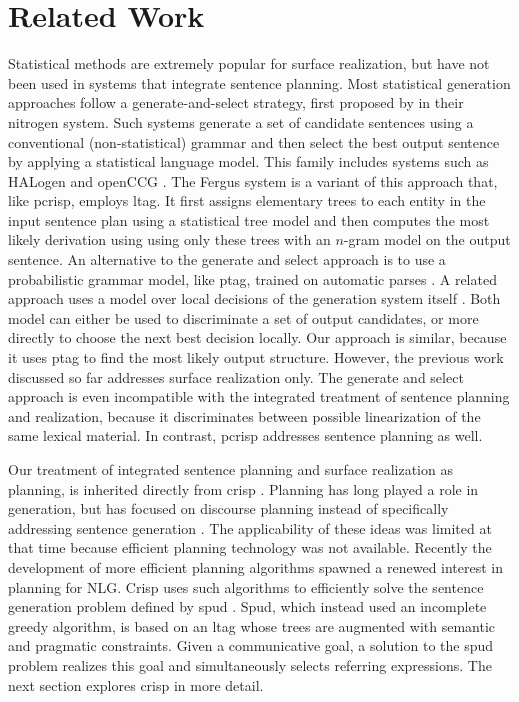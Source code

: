 \section{Related Work}
\label{sec:related}
Statistical methods are extremely popular for surface realization, but have not been used in systems that integrate sentence planning. Most statistical generation approaches follow a generate-and-select strategy, first proposed by  in their {\sc nitrogen} system. Such systems generate a set of candidate sentences using a conventional (non-statistical) grammar and then select the best output sentence by applying a statistical language model. This family includes systems such as {\sc HAL}ogen \cite{langkildeknight1998,langkilde2000} and open{\sc CCG} \cite{whitebaldridge2003}.  The {\sc Fergus} system \cite{bangalorerambow2000} is a variant of this approach that, like {\sc pcrisp}, employs {\sc ltag}. It first assigns elementary trees to each entity in the input sentence plan using a statistical tree model and then computes the most likely derivation using using only these trees with an $n$-gram model on the output sentence. An alternative to the generate and select approach is to use a probabilistic grammar model, like {\sc ptag}, trained on automatic parses \cite{zhongstent2005}. A related approach uses a model over local decisions of the generation system itself \cite{belz2008}. Both model can either be used to discriminate a set of output candidates, or more directly to choose the next best decision locally. Our approach is similar, because it uses {\sc ptag} to find the most likely output structure. However, the previous work discussed so far addresses surface realization only.
The generate and select approach is even incompatible with the integrated treatment of sentence planning and realization, because it discriminates between possible linearization of the same lexical material. In contrast, {\sc pcrisp} addresses sentence planning as well.

Our treatment of integrated sentence planning and surface realization as planning, is inherited directly from {\sc crisp} \cite{kollerstone2007}.  Planning has long played a role in generation, but has focused on discourse planning instead of specifically addressing sentence generation \cite{hovy1988,appelt1992}. The applicability of these ideas was limited at that time because efficient planning technology was not available. Recently the development of more efficient planning algorithms \cite{hoffmannnebel2001,richterwestphal2008} spawned a renewed interest in planning for NLG.  
{\sc Crisp} uses such algorithms to efficiently solve the sentence generation problem defined by {\sc spud} \cite{stonedoran1997}. {\sc Spud}, which instead used an incomplete greedy algorithm, is based on an {\sc ltag} whose trees are augmented with semantic and pragmatic constraints. Given a communicative goal, a solution to the {\sc spud} problem realizes this goal and simultaneously selects referring expressions. The next section explores {\sc crisp} in more detail.
